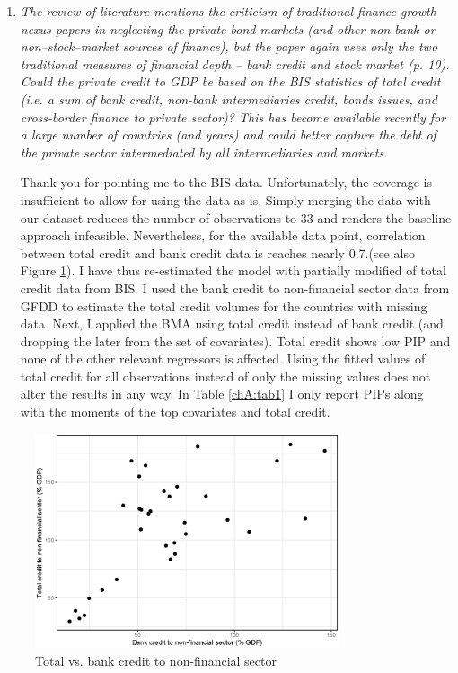 \begin{enumerate}
    \item \textit{The review of literature mentions the criticism of traditional finance-growth nexus papers in neglecting the private bond markets (and other non-bank or non--stock--market sources of finance), but the paper again uses only the two traditional measures of financial depth -- bank credit and stock market (p. 10). Could the private credit to GDP be based on the BIS statistics of total credit (i.e. a sum of bank credit, non-bank intermediaries credit, bonds issues, and cross-border finance to private sector)? This has become available recently for a large number of countries (and years) and could better capture the debt of the private sector intermediated by all intermediaries and markets.}
    
    Thank you for pointing me to the \ac{BIS} data. Unfortunately, the coverage is insufficient to allow for using the data as is. Simply merging the data with our dataset reduces the number of observations to 33 and renders the baseline approach infeasible. Nevertheless, for the available data point, correlation between total credit and bank credit data is reaches nearly 0.7.(see also Figure \ref{app:total_bank_credit}). I have thus re-estimated the model with partially modified of total credit data from \ac{BIS}. I used the bank credit to non-financial sector data from \ac{GFDD} to estimate the total credit volumes for the countries with missing data. Next, I applied the \ac{BMA} using total credit instead of bank credit (and dropping the later from the set of covariates). Total credit shows low \ac{PIP} and none of the other relevant regressors is affected. Using the fitted values of total credit for all observations instead of only the missing values does not alter the results in any way. In Table \ref{chA:tab1} I only report \acp{PIP} along with the moments of the top covariates and total credit.
\end{enumerate}

\begin{figure}[ht!]
  \caption{Total vs. bank credit to non-financial sector}
  \label{app:total_bank_credit}
  \centering
  \includegraphics[width=0.8\textwidth, keepaspectratio]{figures/app/totalcredit_bankcredit}
\end{figure}

